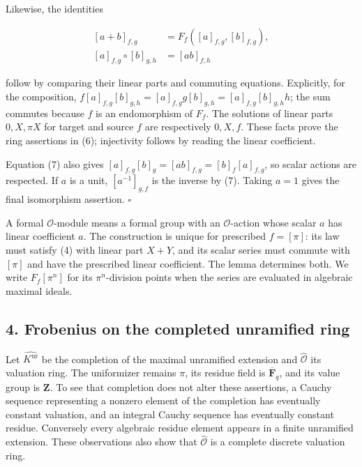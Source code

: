\documentclass[11pt,a4paper]{article}
\begin{document}
Likewise, the identities

\[
\begin{aligned}
[a+b]_{f,g}&=F_f([a]_{f,g},[b]_{f,g}),\\
[a]_{f,g}\circ[b]_{g,h}&=[ab]_{f,h}
\end{aligned}
\tag{7}
\]

follow by comparing their linear parts and commuting equations.
Explicitly, for the composition,
\(f[a]_{f,g}[b]_{g,h}=[a]_{f,g}g[b]_{g,h}=[a]_{f,g}[b]_{g,h}h\); the sum
commutes because \(f\) is an endomorphism of \(F_f\). The solutions of
linear parts \(0,X,\pi X\) for target and source \(f\) are respectively
\(0,X,f\). These facts prove the ring assertions in (6); injectivity
follows by reading the linear coefficient.

Equation (7) also gives \([a]_{f,g}[b]_g=[ab]_{f,g}=[b]_f[a]_{f,g}\), so
scalar actions are respected. If \(a\) is a unit, \([a^{-1}]_{g,f}\) is
the inverse by (7). Taking \(a=1\) gives the final isomorphism
assertion. \(\square\)

A formal \(\mathcal O\)-module means a formal group with an
\(\mathcal O\)-action whose scalar \(a\) has linear coefficient \(a\).
The construction is unique for prescribed \(f=[\pi]\): its law must
satisfy (4) with linear part \(X+Y\), and its scalar series must commute
with \([\pi]\) and have the prescribed linear coefficient. The lemma
determines both. We write \(F_f[\pi^n]\) for its \(\pi^n\)-division
points when the series are evaluated in algebraic maximal ideals.

\subsection{4. Frobenius on the completed unramified
ring}\label{frobenius-on-the-completed-unramified-ring}

Let \(\widehat{K^{\mathrm{ur}}}\) be the completion of the maximal
unramified extension and \(\widehat{\mathcal O}\) its valuation ring.
The uniformizer remains \(\pi\), its residue field is
\(\overline{\mathbf F}_q\), and its value group is \(\mathbf Z\). To see
that completion does not alter these assertions, a Cauchy sequence
representing a nonzero element of the completion has eventually constant
valuation, and an integral Cauchy sequence has eventually constant
residue. Conversely every algebraic residue element appears in a finite
unramified extension. These observations also show that
\(\widehat{\mathcal O}\) is a complete discrete valuation ring.
\end{document}
